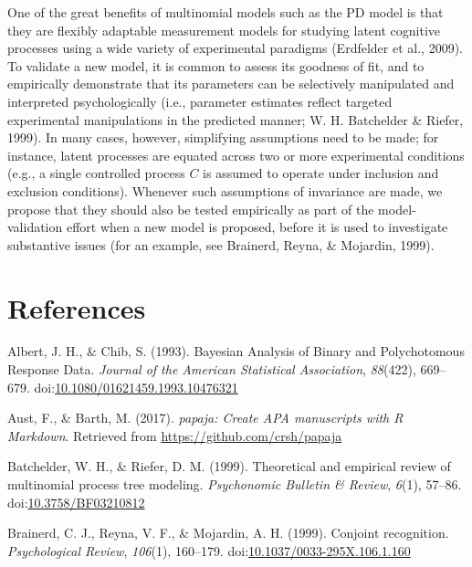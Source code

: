 \documentclass[jou]{apa6}
\theoremstyle{definition}
\theoremstyle{definition}
\theoremstyle{definition}
\theoremstyle{remark}
\begin{document}
One of the great benefits of multinomial models such as the PD model is
that they are flexibly adaptable measurement models for studying latent
cognitive processes using a wide variety of experimental paradigms
(Erdfelder et al., 2009). To validate a new model, it is common to
assess its goodness of fit, and to empirically demonstrate that its
parameters can be selectively manipulated and interpreted
psychologically (i.e., parameter estimates reflect targeted experimental
manipulations in the predicted manner; W. H. Batchelder \& Riefer,
1999). In many cases, however, simplifying assumptions need to be made;
for instance, latent processes are equated across two or more
experimental conditions (e.g., a single controlled process \(C\) is
assumed to operate under inclusion and exclusion conditions). Whenever
such assumptions of invariance are made, we propose that they should
also be tested empirically as part of the model-validation effort when a
new model is proposed, before it is used to investigate substantive
issues (for an example, see Brainerd, Reyna, \& Mojardin, 1999).


\section{References}\label{references}

\setlength{\parindent}{-0.5in} \setlength{\leftskip}{0.5in}
\setlength{\parskip}{8pt}

\hypertarget{refs}{}
\hypertarget{ref-albert_bayesian_1993}{}
Albert, J. H., \& Chib, S. (1993). Bayesian Analysis of Binary and
Polychotomous Response Data. \emph{Journal of the American Statistical
Association}, \emph{88}(422), 669--679.
doi:\href{https://doi.org/10.1080/01621459.1993.10476321}{10.1080/01621459.1993.10476321}

\hypertarget{ref-R-papaja}{}
Aust, F., \& Barth, M. (2017). \emph{papaja: Create APA manuscripts with
R Markdown}. Retrieved from \url{https://github.com/crsh/papaja}

\hypertarget{ref-batchelder_theoretical_1999}{}
Batchelder, W. H., \& Riefer, D. M. (1999). Theoretical and empirical
review of multinomial process tree modeling. \emph{Psychonomic Bulletin
\& Review}, \emph{6}(1), 57--86.
doi:\href{https://doi.org/10.3758/BF03210812}{10.3758/BF03210812}

\hypertarget{ref-brainerd_conjoint_1999}{}
Brainerd, C. J., Reyna, V. F., \& Mojardin, A. H. (1999). Conjoint
recognition. \emph{Psychological Review}, \emph{106}(1), 160--179.
doi:\href{https://doi.org/10.1037/0033-295X.106.1.160}{10.1037/0033-295X.106.1.160}
\end{document}
